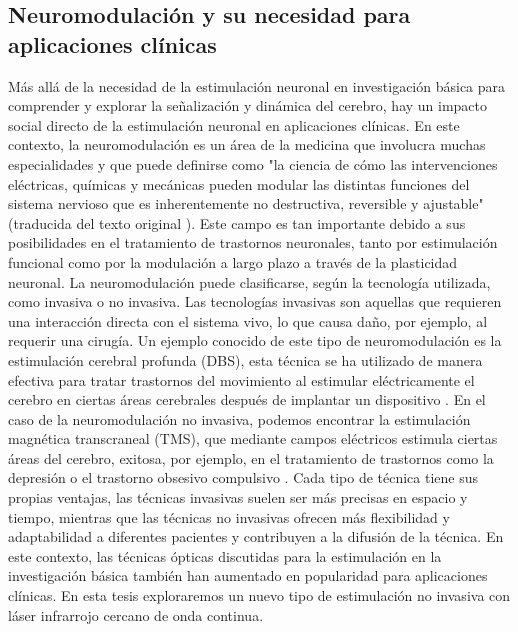 \subsection{Neuromodulación y su necesidad para aplicaciones clínicas}

Más allá de la necesidad de la estimulación neuronal en investigación básica para comprender y explorar la señalización y dinámica del cerebro, hay un impacto social directo de la estimulación neuronal en aplicaciones clínicas. En este contexto, la neuromodulación es un área de la medicina que involucra muchas especialidades y que puede definirse como "la ciencia de cómo las intervenciones eléctricas, químicas y mecánicas pueden modular las distintas funciones del sistema nervioso que es inherentemente no destructiva, reversible y ajustable" (traducida del texto original \cite{krames_neuromodulation_2009}). Este campo es tan importante debido a sus posibilidades en el tratamiento de trastornos neuronales, tanto por estimulación funcional como por la modulación a largo plazo a través de la plasticidad neuronal. La neuromodulación puede clasificarse, según la tecnología utilizada, como invasiva o no invasiva. Las tecnologías invasivas son aquellas que requieren una interacción directa con el sistema vivo, lo que causa daño, por ejemplo, al requerir una cirugía. Un ejemplo conocido de este tipo de neuromodulación es la estimulación cerebral profunda (DBS), esta técnica se ha utilizado de manera efectiva para tratar trastornos del movimiento al estimular eléctricamente el cerebro en ciertas áreas cerebrales después de implantar un dispositivo \parencite{limousin_longterm_2019, hariz_deep_2022}. En el caso de la neuromodulación no invasiva, podemos encontrar la estimulación magnética transcraneal (TMS), que mediante campos eléctricos estimula ciertas áreas del cerebro, exitosa, por ejemplo, en el tratamiento de  trastornos como la depresión o el trastorno obsesivo compulsivo \parencite{valero-cabre_transcranial_2017, clarke_patients_2018}. Cada tipo de técnica tiene sus propias ventajas, las técnicas invasivas suelen ser más precisas en espacio y tiempo, mientras que las técnicas no invasivas ofrecen más flexibilidad y adaptabilidad a diferentes pacientes y contribuyen a la difusión de la técnica. En este contexto, las técnicas ópticas discutidas para la estimulación en la investigación básica también han aumentado en popularidad para aplicaciones clínicas. En esta tesis exploraremos un nuevo tipo de estimulación no invasiva con láser infrarrojo cercano de onda continua. 
